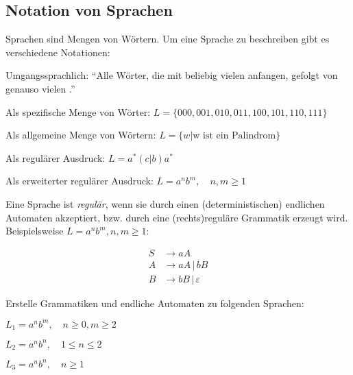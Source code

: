 \documentclass[fontsize=10pt, a4paper, ngerman]{scrartcl}
\begin{document}
\ReiheTitel

\begin{infobox}
\subsection*{Notation von Sprachen}
Sprachen sind Mengen von Wörtern. Um eine Sprache zu beschreiben gibt
es verschiedene Notationen:
\begin{smallitem}
	\item Umgangssprachlich: \enquote{Alle Wörter, die mit beliebig
		vielen  anfangen, gefolgt von genauso vielen .}
	\item Als spezifische Menge von Wörter: $L = \{ 000, 001, 010, 011, 100, 101, 110, 111 \}$
	\item Als allgemeine Menge von Wörtern: $L = \{ w | \text{w ist ein Palindrom} \}$
	\item Als regulärer Ausdruck: $L = a^{*}(c|b)a^{*}$
	\item Als erweiterter regulärer Ausdruck: $L = a^nb^m, \quad n,m \geq 1$
\end{smallitem}
\end{infobox}

Eine Sprache ist \emph{regulär}, wenn sie durch einen (deterministischen)
endlichen Automaten akzeptiert, bzw. durch eine (rechts)reguläre
Grammatik erzeugt wird. Beispielsweise $L=a^nb^m, n,m \geq 1$:
\begin{figure}[h]
	\begin{subfigure}{.5\textwidth}
		\begin{transitiongraph}[fa]
		\end{transitiongraph}
	\end{subfigure}%
	\begin{subfigure}{.5\textwidth}
		\begin{align*}
		S &\rightarrow a A \\
		A &\rightarrow a A \,|\, b B \\
		B &\rightarrow b B \,|\, \varepsilon
		\end{align*}
	\end{subfigure}
\end{figure}

\begin{aufgabe}
\label{aufg:grammatiken-erstellen}
Erstelle Grammatiken und endliche Automaten zu folgenden Sprachen:
\begin{enuma}
	\item $L_1 = a^nb^m, \quad n\geq 0, m \geq 2$
	\item $L_2 = a^nb^n, \quad 1\leq n \leq 2$
	\item $L_3 = a^nb^n, \quad n \geq 1$
\end{enuma}
\end{aufgabe}
\end{document}
